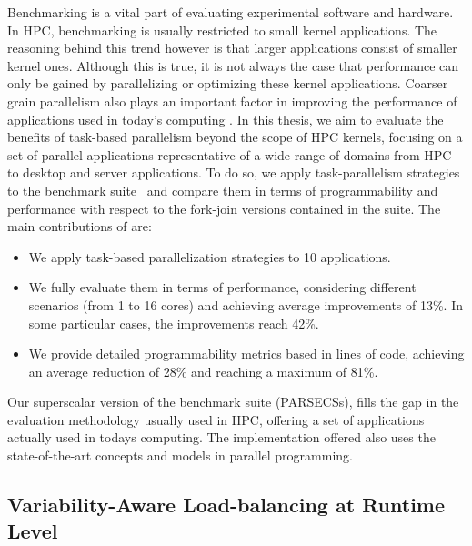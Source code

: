 Benchmarking is a vital part of evaluating experimental software and hardware.  In HPC,
benchmarking is usually restricted to small kernel applications.  The reasoning behind
this trend however is that larger applications consist of smaller kernel ones.  Although
this is true, it is not always the case that performance can only be gained by
parallelizing or optimizing these kernel applications.  Coarser grain parallelism also
plays an important factor in improving the performance of applications used in today's
computing \PARSEC{} \cite{Bienia:PhD2011}.    In this thesis, we aim to evaluate the
benefits of task-based parallelism beyond the scope of HPC kernels, focusing on a set of
parallel applications representative of a wide range of domains from HPC to desktop and
server applications.  To do so, we apply task-parallelism strategies to the \PARSEC{}
benchmark suite~\cite{Bienia:PhD2011} and compare them in terms of programmability and
performance with respect to the fork-join versions contained in the suite. 
The main contributions of are:
\begin{itemize}
	\item We apply task-based parallelization strategies to 10 \PARSEC{} applications. 
	\item We fully evaluate them in terms of performance, considering different scenarios 
(from 1 to 16 cores) and achieving average improvements of 13\%. 
In some particular cases, the improvements reach 42\%. 
	\item We provide detailed programmability metrics based in lines of code, achieving an 
average reduction of 28\% and reaching a maximum of 81\%.
\end{itemize}

Our superscalar version of the \PARSEC{} benchmark suite (PARSECSs), fills the gap in the
evaluation methodology usually used in HPC, offering a set of applications actually used
in todays computing. The implementation offered also uses the state-of-the-art concepts
and models in parallel programming.

\subsection{Variability-Aware Load-balancing at Runtime Level}

